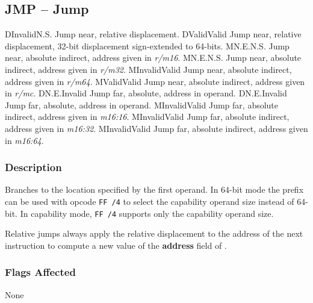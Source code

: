 \clearpage
{}
{}
\subsection*{JMP -- Jump}

\begin{x86opcodetable}
  {D}{Invalid}{N.S.}
  {Jump near, relative displacement.}
  {D}{Valid}{Valid}
  {Jump near, relative displacement, 32-bit displacement sign-extended
    to 64-bits.}
  {M}{N.E.}{N.S.}
  {Jump near, absolute indirect, address given in \emph{r/m16}.}
  {M}{N.E.}{N.S.}
  {Jump near, absolute indirect, address given in \emph{r/m32}.}
  {M}{Invalid}{Valid}
  {Jump near, absolute indirect, address given in \emph{r/m64}.}
  {M}{Valid}{Valid}
  {Jump near, absolute indirect, address given in \emph{r/mc}.}
  {D}{N.E.}{Invalid}
  {Jump far, absolute, address in operand.}
  {D}{N.E.}{Invalid}
  {Jump far, absolute, address in operand.}
  {M}{Invalid}{Valid}
  {Jump far, absolute indirect, address given in \emph{m16:16}.}
  {M}{Invalid}{Valid}
  {Jump far, absolute indirect, address given in \emph{m16:32}.}
  {M}{Invalid}{Valid}
  {Jump far, absolute indirect, address given in \emph{m16:64}.}
\end{x86opcodetable}

\begin{x86opentable}
\end{x86opentable}

\subsubsection*{Description}

Branches to the location specified by the first operand.  In 64-bit
mode the  prefix can be used with opcode \texttt{FF /4}
to select the capability operand size instead of 64-bit.  In
capability mode, \texttt{FF /4} supports only the capability operand
size.

Relative jumps always apply the relative displacement to the address
of the next instruction to compute a new value of the \textbf{address}
field of \CIP{}.

\subsubsection*{Flags Affected}

None
